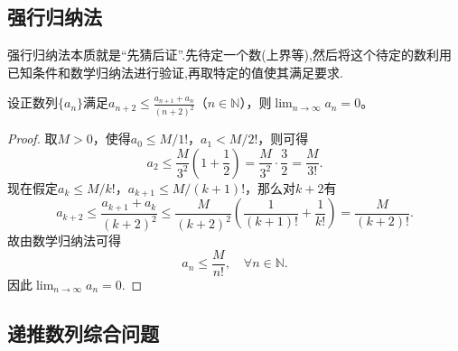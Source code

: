 \documentclass[../../main.tex]{subfiles}
\begin{document}
\subsection{强行归纳法}

强行归纳法本质就是“先猜后证”.先待定一个数(上界等),然后将这个待定的数利用已知条件和数学归纳法进行验证,再取特定的值使其满足要求.

\begin{example}
设正数列\(\{a_n\}\)满足\(a_{n+2} \leqslant \frac{a_{n+1} + a_n}{(n+2)^2}\)（\(n \in \mathbb{N}\)），则\(\lim_{n \to \infty} a_n = 0\)。
\end{example}
\begin{proof}
取\(M > 0\)，使得\(a_0 \leqslant M/1!\)，\(a_1 < M/2!\)，则可得
\[
a_2 \leqslant \frac{M}{3^2}\left(1 + \frac{1}{2}\right) = \frac{M}{3^2} \cdot \frac{3}{2} = \frac{M}{3!}.
\]
现在假定\(a_k \leqslant M/k!\)，\(a_{k+1} \leqslant M/(k+1)!\)，那么对\(k+2\)有
\[
a_{k+2} \leqslant \frac{a_{k+1} + a_k}{(k+2)^2} \leqslant \frac{M}{(k+2)^2}\left( \frac{1}{(k+1)!} + \frac{1}{k!} \right) = \frac{M}{(k+2)!}.
\]
故由数学归纳法可得$$a_n\leqslant \frac{M}{n!},\quad \forall n\in \mathbb{N}.$$
因此\(\lim_{n \to \infty} a_n = 0.\)

\end{proof}


\subsection{递推数列综合问题}
\end{document}
